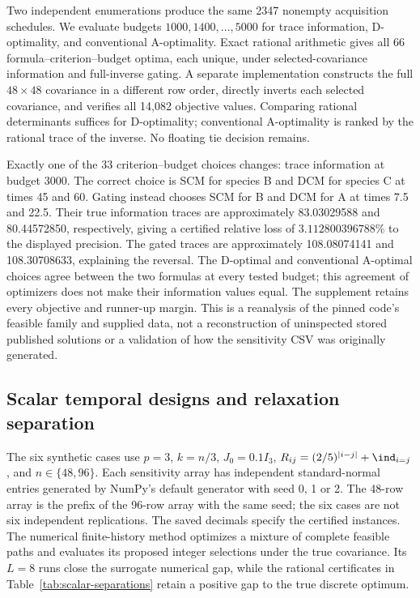 Two independent enumerations produce the same 2347 nonempty acquisition
schedules. We evaluate budgets $1000,1400,\ldots,5000$ for trace information,
D-optimality, and conventional A-optimality. Exact rational arithmetic gives
all 66 formula--criterion--budget optima, each unique, under selected-covariance
information and full-inverse gating. A separate implementation constructs the
full $48\times48$ covariance in a different row order, directly inverts each
selected covariance, and verifies all 14,082 objective values. Comparing
rational determinants suffices for D-optimality; conventional A-optimality is
ranked by the rational trace of the inverse. No floating tie decision remains.

Exactly one of the 33 criterion--budget choices changes: trace information
at budget 3000. The correct choice is SCM for species B and DCM for species C
at times 45 and 60. Gating instead chooses SCM for B and DCM for A at times
7.5 and 22.5. Their true information traces are approximately 83.03029588 and
80.44572850, respectively, giving a certified relative loss of
$3.112800396788\%$ to the displayed precision. The gated traces are approximately
108.08074141 and 108.30708633, explaining the reversal. The D-optimal and
conventional A-optimal choices agree between the two formulas at every tested
budget; this agreement of optimizers does not make their information values
equal. The supplement retains every objective and runner-up margin.
This is a reanalysis of the pinned code's feasible family and supplied data,
not a reconstruction of uninspected stored published solutions or a validation
of how the sensitivity CSV was originally generated.

\subsection{Scalar temporal designs and relaxation separation}
\label{subsec:scalar-experiments}

The six synthetic cases use $p=3$, $k=n/3$, $J_0=0.1I_3$,
$R_{ij}=(2/5)^{|i-j|}+\ind_{i=j}$, and $n\in\{48,96\}$.
Each sensitivity array has independent standard-normal entries generated
by NumPy's default generator with seed 0, 1 or 2. The 48-row array is the
prefix of the 96-row array with the same seed; the six cases are not six
independent replications. The saved decimals specify the certified instances.
The numerical finite-history method optimizes a mixture of complete feasible
paths and evaluates its proposed integer selections under the true covariance.
Its $L=8$ runs close the surrogate numerical gap, while the rational
certificates in Table~\ref{tab:scalar-separations} retain a positive gap to the
true discrete optimum.


